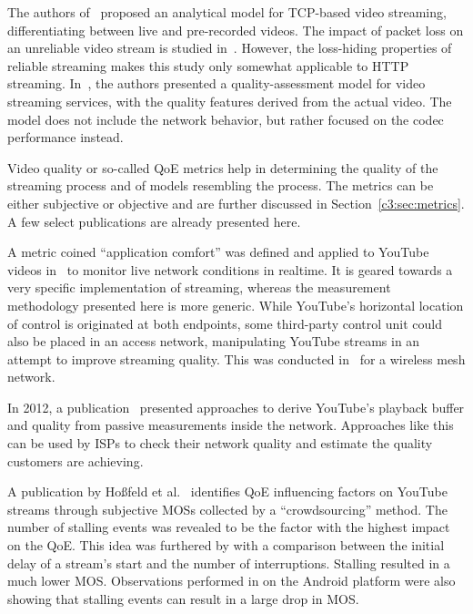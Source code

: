 The authors of~\cite{wang2003model} proposed an analytical model for \gls{TCP}-based video streaming, differentiating between live and pre-recorded videos. The impact of packet loss on an unreliable video stream is studied in~\cite{pv2010loss}. However, the loss-hiding properties of reliable streaming makes this study only somewhat applicable to \gls{HTTP} streaming. In~\cite{pv2010qoe}, the authors presented a quality-assessment model for video streaming services, with the quality features derived from the actual video. The model does not include the network behavior, but rather focused on the codec performance instead. 

Video quality or so-called \gls{QoE} metrics help in determining the quality of the streaming process and of models resembling the process. The metrics can be either subjective or objective and are further discussed in Section~\ref{c3:sec:metrics}. A few select publications are already presented here.

A metric coined ``application comfort'' was defined and applied to YouTube videos in~\cite{staehle2010yomo} to monitor live network conditions in realtime. It is geared towards a very specific implementation of streaming, whereas the measurement methodology presented here is more generic. While YouTube's horizontal location of control is originated at both endpoints, some third-party control unit could also be placed in an access network, manipulating YouTube streams in an attempt to improve streaming quality. This was conducted in~\cite{5733220} for a wireless mesh network.

In 2012, a publication~\cite{6296879} presented approaches to derive YouTube's playback buffer and quality from passive measurements inside the network. Approaches like this can be used by \glspl{ISP} to check their network quality and estimate the quality customers are achieving. 

A publication by Hoßfeld et al.~\cite{6123395} identifies \gls{QoE} influencing factors on YouTube streams through subjective \glspl{MOS} collected by a ``crowdsourcing'' method. The number of stalling events was revealed to be the factor with the highest impact on the \gls{QoE}. This idea was furthered by \cite{6263849} with a comparison between the initial delay of a stream's start and the number of interruptions. Stalling resulted in a much lower \gls{MOS}. Observations performed in \cite{ketyko2010qoe} on the Android platform were also showing that stalling events can result in a large drop in \gls{MOS}. 

